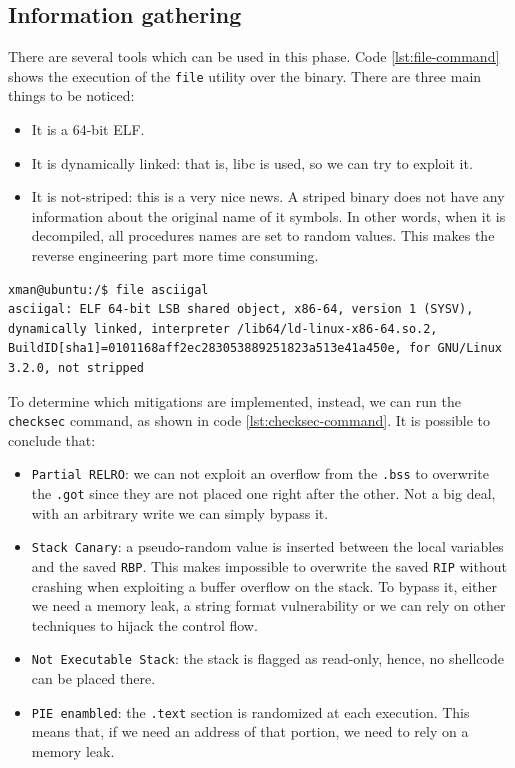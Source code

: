 \documentclass{article}
\numberwithin{equation}{subsection}
\begin{document}
\subsection{Information gathering}
There are several tools which can be used in this phase.
Code \ref{lst:file-command} shows the execution of the \texttt{file} utility over the binary. There are three main things to be noticed:
\begin{itemize}
    \item It is a 64-bit ELF.
    \item It is dynamically linked: that is, libc is used, so we can try to exploit it.
    \item It is not-striped: this is a very nice news. A striped binary does not have any information about the original name of it symbols. In other words, when it is decompiled, all procedures names are set to random values. This makes the reverse engineering part more time consuming.
\end{itemize}
\begin{minipage}{\textwidth}
\centering
\lstset{style=consolestyle}
\begin{lstlisting}[caption={File command on asciigal executable.},captionpos=b,label={lst:file-command}]
xman@ubuntu:/$ file asciigal
asciigal: ELF 64-bit LSB shared object, x86-64, version 1 (SYSV), dynamically linked, interpreter /lib64/ld-linux-x86-64.so.2, BuildID[sha1]=0101168aff2ec283053889251823a513e41a450e, for GNU/Linux 3.2.0, not stripped
\end{lstlisting}
\end{minipage}
\clearpage\noindent
To determine which mitigations are implemented, instead, we can run the \texttt{checksec} command, as shown in code \ref{lst:checksec-command}. It is possible to conclude that:
\begin{itemize}
    \item \texttt{Partial RELRO}: we can not exploit an overflow from the \texttt{.bss} to overwrite the \texttt{.got} since they are not placed one right after the other. Not a big deal, with an arbitrary write we can simply bypass it.
    \item \texttt{Stack Canary}: a pseudo-random value is inserted between the local variables and the saved \texttt{RBP}. This makes impossible to overwrite the saved \texttt{RIP} without crashing when exploiting a buffer overflow on the stack. To bypass it, either we need a memory leak, a string format vulnerability or we can rely on other techniques to hijack the control flow.
    \item \texttt{Not Executable Stack}: the stack is flagged as read-only, hence, no shellcode can be placed there.
    \item \texttt{PIE enambled}: the \texttt{.text} section is randomized at each execution. This means that, if we need an address of that portion, we need to rely on a memory leak.
\end{itemize}
\end{document}
